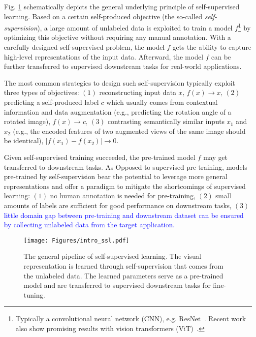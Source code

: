 \documentclass[lettersize,journal]{IEEEtran}
\begin{document}
Fig. \ref{fig:SelfSupervisionScheme} schematically depicts the general underlying principle of self-supervised learning. Based on a certain self-produced objective (the so-called \textit{self-supervision}), a large amount of unlabeled data is exploited to train a model $f$\footnote{Typically a convolutional neural network (CNN), e.g. ResNet~\cite{he2016deep}. Recent work also show promising results with vision transformers (ViT)~\cite{dosovitskiy2020image}.} by optimizing this objective without requiring any manual annotation. With a carefully designed self-supervised problem, the model $f$ gets the ability to capture high-level representations of the input data. Afterward, the model $f$ can be further transferred to supervised downstream tasks for real-world applications.  

The most common strategies to design such self-supervision typically exploit three types of objectives: $(1)$ reconstructing input data $x$, $f(x)\rightarrow x$, $(2)$ predicting a self-produced label $c$ which usually comes from contextual information and data augmentation (e.g., predicting the rotation angle of a rotated image), $f(x)\rightarrow c$, $(3)$ contrasting semantically similar inputs $x_1$ and $x_2$ (e.g., the encoded features of two augmented views of the same image should be identical), $|f(x_1)-f(x_2)|\rightarrow 0$.

Given self-supervised training succeeded, the pre-trained model $f$ may get transferred to downstream tasks. As Opposed to supervised pre-training, models pre-trained by self-supervision bear the potential to leverage more general representations and offer a paradigm to mitigate the shortcomings of supervised learning: $(1)$ no human annotation is needed for pre-training, $(2)$ small amounts of labels are sufficient for good performance on downstream tasks, $(3)$ \textcolor{blue}{little domain gap between pre-training and downstream dataset can be ensured by collecting unlabeled data from the target application.}


\begin{figure}
    \centering
    \texttt{[image: Figures/intro\_ssl.pdf]}
    \caption{The general pipeline of self-supervised learning. The visual representation is learned through self-supervision that comes from the unlabeled data. The learned parameters serve as a pre-trained model and are transferred to supervised downstream tasks for fine-tuning.}
    \label{fig:SelfSupervisionScheme}
\end{figure}
\end{document}
